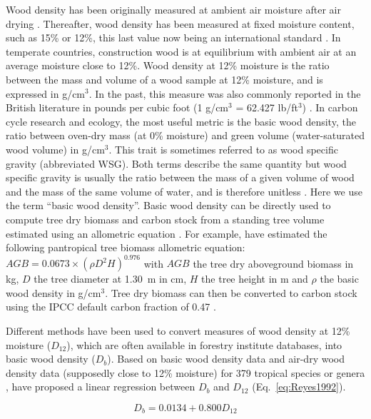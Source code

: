 \documentclass[a4paper, 12pt, leqno, dvipsnames]{article}\usepackage[]{graphicx}\usepackage[]{color}
\begin{document}
Wood density has been originally measured at ambient air moisture after air drying \citep{Glass2010}. Thereafter, wood density has been measured at fixed moisture content, such as 15\% or 12\%, this last value now being an international standard \citep{Sallenave1955}. In temperate countries, construction wood is at equilibrium with ambient air at an average moisture close to 12\%. Wood density at 12\% moisture is the ratio between the mass and volume of a wood sample at 12\% moisture, and is expressed in g/cm$^3$. In the past, this measure was also commonly reported in the British literature in pounds per cubic foot (1 g/cm$^3$ = 62.427 lb/ft$^3$) \citep{Sallenave1971, Reyes1992}. In carbon cycle research and ecology, the most useful metric is the basic wood density, the ratio between oven-dry mass (at 0\% moisture) and green volume (water-saturated wood volume) in g/cm$^3$. This trait is sometimes referred to as wood specific gravity (abbreviated WSG). Both terms describe the same quantity but wood specific gravity is usually the ratio between the mass of a given volume of wood and the mass of the same volume of water, and is therefore unitless \citep{Williamson2010}. Here we use the term ``basic wood density''. Basic wood density can be directly used to compute tree dry biomass and carbon stock from a standing tree volume estimated using an allometric equation \citep{Brown1997, Chave2005, Chave2014, Vieilledent2012}. For example, \citet{Chave2014} have estimated the following pantropical tree biomass allometric equation: $AGB=0.0673 \times (\rho D^{2} H)^{0.976}$ with $AGB$ the tree dry aboveground biomass in kg, $D$ the tree diameter at 1.30~m in cm, $H$ the tree height in m and $\rho$ the basic wood density in g/cm$^3$. Tree dry biomass can then be converted to carbon stock using the IPCC default carbon fraction of 0.47 \citep{McGroddy2004}.

Different methods have been used to convert measures of wood density at 12\% moisture ($D_{12}$), which are often available in forestry institute databases, into basic wood density ($D_b$). Based on basic wood density data and air-dry wood density data (supposedly close to 12\% moisture) for 379 tropical species or genera \citep{Chudnoff1984}, \citet{Reyes1992} have proposed a linear regression between $D_b$ and $D_{12}$ (Eq.~\ref{eq:Reyes1992}). 

\begin{equation}
  \label{eq:Reyes1992}
  D_b = 0.0134 + 0.800 D_{12}
\end{equation}
\end{document}
